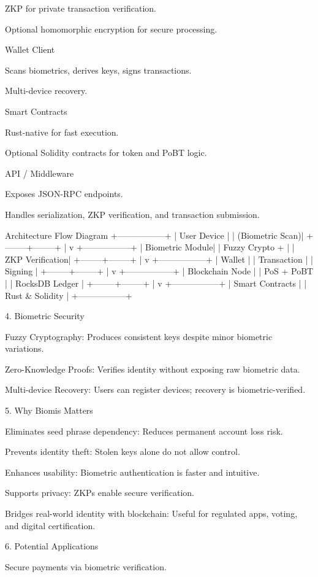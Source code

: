 ZKP for private transaction verification.

Optional homomorphic encryption for secure processing.

Wallet Client

Scans biometrics, derives keys, signs transactions.

Multi-device recovery.

Smart Contracts

Rust-native for fast execution.

Optional Solidity contracts for token and PoBT logic.

API / Middleware

Exposes JSON-RPC endpoints.

Handles serialization, ZKP verification, and transaction submission.

Architecture Flow Diagram
+-----------------+
|  User Device    |
| (Biometric Scan)|
+--------+--------+
         |
         v
+-----------------+
| Biometric Module|
| Fuzzy Crypto +  |
| ZKP Verification|
+--------+--------+
         |
         v
+-----------------+
|      Wallet     |
| Transaction     |
| Signing         |
+--------+--------+
         |
         v
+-----------------+
| Blockchain Node |
| PoS + PoBT      |
| RocksDB Ledger  |
+--------+--------+
         |
         v
+-----------------+
| Smart Contracts |
| Rust & Solidity |
+-----------------+

4. Biometric Security

Fuzzy Cryptography: Produces consistent keys despite minor biometric variations.

Zero-Knowledge Proofs: Verifies identity without exposing raw biometric data.

Multi-device Recovery: Users can register devices; recovery is biometric-verified.

5. Why Biomis Matters

Eliminates seed phrase dependency: Reduces permanent account loss risk.

Prevents identity theft: Stolen keys alone do not allow control.

Enhances usability: Biometric authentication is faster and intuitive.

Supports privacy: ZKPs enable secure verification.

Bridges real-world identity with blockchain: Useful for regulated apps, voting, and digital certification.

6. Potential Applications

Secure payments via biometric verification.

